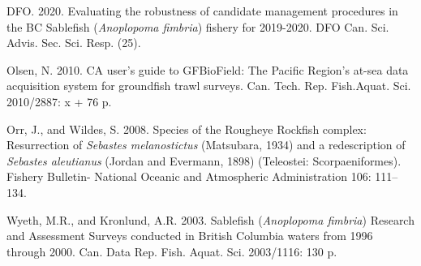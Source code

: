 \documentclass[12pt]{article}\usepackage[]{graphicx}\usepackage[]{color}
\begin{document}
\noindent \vspace{-2em} \setlength{\parindent}{-0.2in} \setlength{\leftskip}{0.2in} \setlength{\parskip}{8pt}

\hypertarget{refs}{}
\begin{CSLReferences}{1}{0}
%
DFO. 2020. Evaluating the robustness of candidate management procedures in the {BC} {S}ablefish ({\emph{Anoplopoma fimbria}}) fishery for 2019-2020. DFO Can. Sci. Advis. Sec. Sci. Resp. (25).

%
Olsen, N. 2010. CA user's guide to {GFBioField: The Pacific Region's} at-sea data acquisition system for groundfish trawl surveys. Can. Tech. Rep. Fish.Aquat. Sci. 2010/2887: x + 76 p.

%
Orr, J., and Wildes, S. 2008. Species of the {R}ougheye {R}ockfish complex: {R}esurrection of {\emph{Sebastes melanostictus}} ({M}atsubara, 1934) and a redescription of {\emph{Sebastes aleutianus}} ({J}ordan and {E}vermann, 1898) ({T}eleostei: {S}corpaeniformes). Fishery Bulletin- National Oceanic and Atmospheric Administration 106: 111--134.

%
Wyeth, M.R., and Kronlund, A.R. 2003. Sablefish ({\emph{Anoplopoma fimbria}}) {Research and Assessment Surveys} conducted in {British Columbia} waters from 1996 through 2000. Can. Data Rep. Fish. Aquat. Sci. 2003/1116: 130 p.

\end{CSLReferences}
\end{document}
